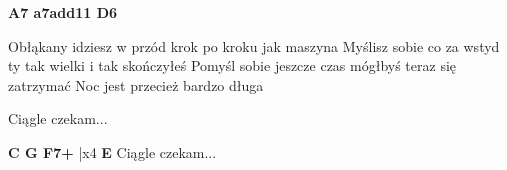 \documentclass[../../../songbook.tex]{subfiles}
\begin{document}
{\color{red}\textbf{A7  a7add11  D6} } \newline

Obłąkany idziesz w przód krok po kroku jak maszyna \newline
Myślisz sobie co za wstyd ty tak wielki i tak skończyłeś \newline
Pomyśl sobie jeszcze czas mógłbyś teraz się zatrzymać \newline
Noc jest przecież bardzo długa \newline

\-\hspace{1cm} Ciągle czekam... \newline

{\color{red}\textbf{C G F7+ } } |x4 \newline
{\color{red}\textbf{E} } \newline
\-\hspace{1cm} Ciągle czekam... \newline
\end{document}
